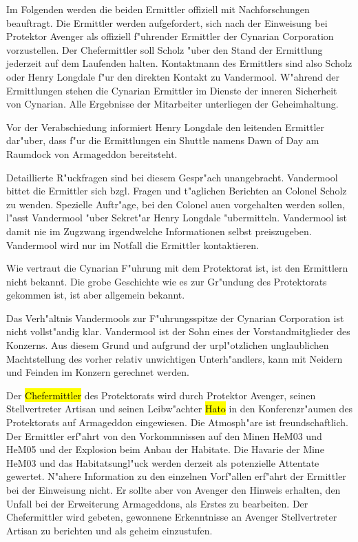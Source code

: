 Im Folgenden werden die beiden Ermittler offiziell mit Nachforschungen beauftragt. Die Ermittler werden aufgefordert, sich nach der Einweisung bei Protektor Avenger als offiziell f"uhrender Ermittler der Cynarian Corporation vorzustellen. Der Chefermittler soll Scholz "uber den Stand der Ermittlung jederzeit auf dem Laufenden halten. Kontaktmann des Ermittlers sind also Scholz oder Henry Longdale f"ur den direkten Kontakt zu Vandermool. W"ahrend der Ermittlungen stehen die Cynarian Ermittler im Dienste der inneren Sicherheit von Cynarian. Alle Ergebnisse der Mitarbeiter unterliegen der Geheimhaltung.

Vor der Verabschiedung informiert Henry Longdale den leitenden Ermittler dar"uber, dass f"ur die Ermittlungen ein Shuttle namens Dawn of Day am Raumdock von Armageddon bereitsteht.


\begin{remarks}	
	Detaillierte R"uckfragen sind bei diesem Gespr"ach unangebracht. Vandermool bittet die Ermittler sich bzgl. Fragen und t"aglichen Berichten an Colonel Scholz zu wenden. Spezielle Auftr"age, bei den Colonel au\3en vorgehalten werden sollen, l"asst Vandermool "uber Sekret"ar Henry Longdale "ubermitteln. Vandermool ist damit nie im Zugzwang irgendwelche Informationen selbst preiszugeben. Vandermool wird nur im Notfall die Ermittler kontaktieren.

	Wie vertraut die Cynarian F"uhrung mit dem Protektorat ist, ist den Ermittlern nicht bekannt. Die grobe Geschichte wie es zur Gr"undung des Protektorats gekommen ist, ist aber allgemein bekannt.

	Das Verh"altnis Vandermools zur F"uhrungsspitze der Cynarian Corporation ist nicht vollst"andig klar. Vandermool ist der Sohn eines der Vorstandmitglieder des Konzerns. Aus diesem Grund und aufgrund der urpl"otzlichen unglaublichen Machtstellung des vorher relativ unwichtigen Unterh"andlers, kann mit Neidern und Feinden im Konzern gerechnet werden.
\end{remarks}



Der \hl{Chefermittler} des Protektorats wird durch Protektor Avenger, seinen Stellvertreter Artisan und seinen Leibw"achter \hl{Hato} in den Konferenzr"aumen des Protektorats auf Armageddon eingewiesen. Die Atmosph"are ist freundschaftlich. Der Ermittler erf"ahrt von den Vorkommnissen auf den Minen HeM03 und HeM05 und der Explosion beim Anbau der Habitate. Die Havarie der Mine HeM03 und das Habitatsungl"uck werden derzeit als potenzielle Attentate gewertet. N"ahere Information zu den einzelnen Vorf"allen erf"ahrt der Ermittler bei der Einweisung nicht. Er sollte aber von Avenger den Hinweis erhalten, den Unfall bei der Erweiterung Armageddons, als Erstes zu bearbeiten. Der Chefermittler wird gebeten, gewonnene Erkenntnisse an Avenger Stellvertreter Artisan zu berichten und als geheim einzustufen.

